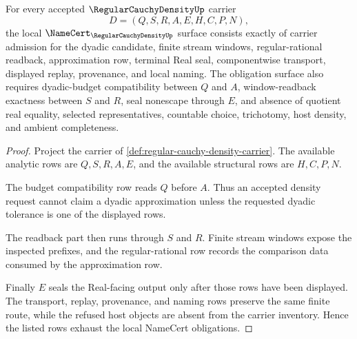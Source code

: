 \begin{theorem}
\label{thm:regular-cauchy-density-namecert-obligations}
For every accepted $\RegularCauchyDensityUp$ carrier
$$
D=(Q,S,R,A,E,H,C,P,N),
$$
the local $\NameCert_{\RegularCauchyDensityUp}$ surface consists exactly of
carrier admission for the dyadic candidate, finite stream windows,
regular-rational readback, approximation row, terminal Real seal,
componentwise transport, displayed replay, provenance, and local naming. The
obligation surface also requires dyadic-budget compatibility between $Q$ and
$A$, window-readback exactness between $S$ and $R$, seal nonescape through
$E$, and absence of quotient real equality, selected representatives,
countable choice, trichotomy, host density, and ambient completeness.
\end{theorem}
\begin{proof}
Project the carrier of \autoref{def:regular-cauchy-density-carrier}. The
available analytic rows are $Q,S,R,A,E$, and the available structural rows are
$H,C,P,N$.

The budget compatibility row reads $Q$ before $A$. Thus an accepted density
request cannot claim a dyadic approximation unless the requested dyadic
tolerance is one of the displayed rows.

The readback part then runs through $S$ and $R$. Finite stream windows expose
the inspected prefixes, and the regular-rational row records the comparison
data consumed by the approximation row.

Finally $E$ seals the Real-facing output only after those rows have been
displayed. The transport, replay, provenance, and naming rows preserve the
same finite route, while the refused host objects are absent from the carrier
inventory. Hence the listed rows exhaust the local NameCert obligations.
\end{proof}

